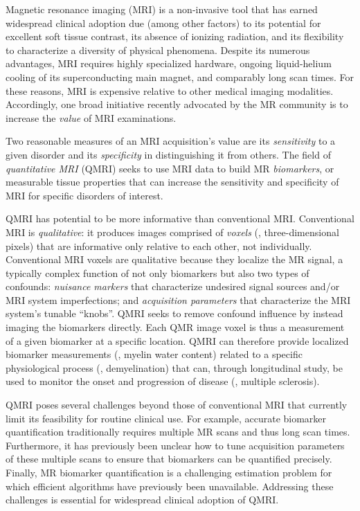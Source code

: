 
Magnetic resonance imaging (MRI)
is a non-invasive tool
that has earned widespread clinical adoption
due (among other factors) 
to its potential for excellent soft tissue contrast,
its absence of ionizing radiation,
and its flexibility to characterize 
a diversity of physical phenomena. 
Despite its numerous advantages,
MRI requires highly specialized hardware,
ongoing liquid-helium cooling
of its superconducting main magnet,
and comparably long scan times.
For these reasons,
MRI is expensive relative
to other medical imaging modalities.
Accordingly,
one broad initiative 
recently advocated by the MR community 
is to increase the \emph{value}
of MRI examinations.

Two reasonable measures
of an MRI acquisition's value
are its \emph{sensitivity}
to a given disorder
and its \emph{specificity}
in distinguishing it
from others.
The field of \emph{quantitative MRI} (QMRI)
seeks to use MRI data 
to build MR \emph{biomarkers},
or measurable tissue properties
that can increase the sensitivity and specificity of MRI
for specific disorders of interest.

QMRI has potential
to be more informative than conventional MRI.
Conventional MRI is \emph{qualitative}:
it produces images comprised of \emph{voxels}
(\ie, three-dimensional pixels)
that are informative only relative to each other,
not individually.
Conventional MRI voxels are qualitative
because they localize the MR signal,
a typically complex function
of not only biomarkers
but also two types of confounds:
\emph{nuisance markers}
that characterize undesired signal sources
and/or MRI system imperfections;
and \emph{acquisition parameters}
that characterize the MRI system's tunable ``knobs''. 
QMRI seeks to remove confound influence
by instead imaging the biomarkers directly.
Each QMR image voxel
is thus a measurement 
of a given biomarker
at a specific location.
QMRI can therefore provide localized biomarker measurements
(\eg, myelin water content)
related to a specific physiological process
(\eg, demyelination)
that can, through longitudinal study,
be used to monitor the onset and progression of disease
(\eg, multiple sclerosis). 

QMRI poses several challenges
beyond those of conventional MRI 
that currently limit its feasibility 
for routine clinical use.
For example,
accurate biomarker quantification 
traditionally requires multiple MR scans
and thus long scan times.
Furthermore,
it has previously been unclear
how to tune acquisition parameters 
of these multiple scans
to ensure that biomarkers can be quantified precisely.
Finally, MR biomarker quantification
is a challenging estimation problem
for which efficient algorithms
have previously been unavailable.
Addressing these challenges is essential
for widespread clinical adoption of QMRI.

